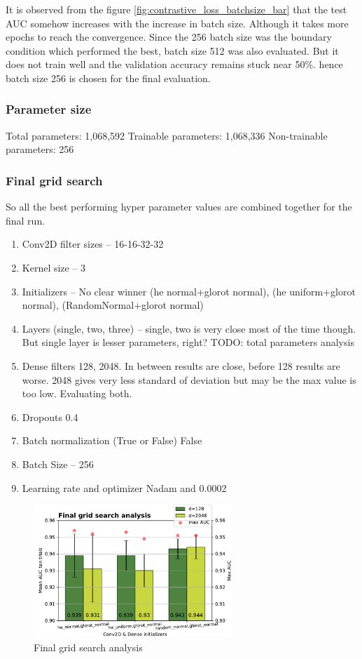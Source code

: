 It is observed from the figure \ref{fig:contrastive_loss_batchsize_bar} that the test AUC somehow increases with the increase in batch size. Although it takes more epochs to reach the convergence. 
Since the 256 batch size was the boundary condition which performed the best, batch size 512 was also evaluated. But it does not train well and the validation accuracy remains stuck near 50\%.
hence batch size 256 is chosen for the final evaluation. 

\subsubsection{Parameter size}
Total parameters: 1,068,592
Trainable parameters: 1,068,336
Non-trainable parameters: 256

\flushbottom
\newpage

\subsubsection{Final grid search}
So all the best performing hyper parameter values are combined together for the final run. 

\begin{enumerate}
   \item Conv2D filter sizes -- 16-16-32-32
   \item Kernel size -- 3
   \item Initializers -- No clear winner (he normal+glorot normal), (he uniform+glorot normal), (RandomNormal+glorot normal)
   \item Layers (single, two, three) -- single, two is very close most of the time though. But single layer is lesser parameters, right? TODO: total parameters analysis
   \item Dense filters 128, 2048. In between results are close, before 128 results are worse. 2048 gives very less standard of deviation but may be the max value is too low. Evaluating both.
   \item Dropouts 0.4
   \item Batch normalization (True or False) False
   \item Batch Size -- 256
   \item Learning rate and optimizer Nadam and 0.0002
  \end{enumerate}

\begin{figure}[ht]
\centering
\includegraphics[height= 5cm]{images/contrastive/contrastive_loss_final_bar}
\caption{Final grid search analysis}
\label{fig:contrastive_loss_final_bar}
\end{figure}

